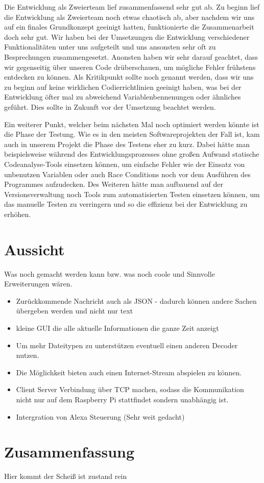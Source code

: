 Die Entwicklung als Zweierteam lief zusammenfassend sehr gut ab.
Zu beginn lief die Entwicklung als Zweierteam noch etwas chaotisch ab, aber
nachdem wir uns auf ein finales Grundkonzept geeinigt hatten, funktionierte die
Zusammenarbeit doch sehr gut. Wir haben bei der Umsetzungen die Entwicklung
verschiedener Funktionalitäten unter uns aufgeteilt und uns ansonsten sehr oft
zu Besprechungen zusammengesetzt. Anonsten haben wir sehr darauf geachtet, dass
wir gegenseitig über unseren Code drüberschauen, um mögliche Fehler frühstens
entdecken zu können. Als Kritikpunkt sollte noch genannt werden, dass wir uns
zu beginn auf keine wirklichen Codierrichtlinien geeinigt haben, was bei der
Entwicklung öfter mal zu abweichend Variablenbennenungen oder ähnliches
geführt. Dies sollte in Zukunft vor der Umsetzung beachtet werden. \newline

Ein weiterer Punkt, welcher beim nächsten Mal noch optimiert werden könnte ist
die Phase der Testung. Wie es in den meisten Softwareprojekten der Fall ist, %
kam auch in unserem Projekt die Phase des Testens eher zu kurz. Dabei hätte man
beispielsweise während des Entwicklungsprozesses ohne großen Aufwand statische
Codeanalyse-Tools einsetzen können, um einfache Fehler wie der Einsatz von
unbenutzen Variablen oder auch Race Conditions noch vor dem Ausführen des
Programmes aufzudecken. Des Weiteren hätte man aufbauend auf der
Versionsverwaltung noch Tools zum automatisierten Testen einsetzen können, um
das manuelle Testen zu verringern und so die effizienz bei der Entwicklung zu
erhöhen.

\begin{comment}
- Codierrichtlinien
- Viel gelernt
- Go als Programmiersprache
- Kommunikation über Sockets zwischen zwei Programmen
- Analyse zu kurz
- Testung zu kurz
  - Countinous Integration
  - Static Code analysis
  - automatic testing with unit test
\end{comment}



\section{Aussicht}

Was noch gemacht werden kann bzw. was noch coole und Sinnvolle Erweiterungen wären.
\begin{itemize}
\item Zurückkommende Nachricht auch als JSON - dadurch können andere Sachen übergeben werden und nicht nur text
\item kleine GUI die alle aktuelle Informationen die ganze Zeit anzeigt
\item Um mehr Dateitypen zu unterstützen eventuell einen anderen Decoder nutzen.
\item Die Möglichkeit bieten auch einen Internet-Stream abspielen zu können.
\item Client Server Verbindung über TCP machen, sodass die Kommunikation nicht nur auf dem Raspberry Pi stattfindet sondern unabhängig ist.
\item Intergration von Alexa Steuerung (Sehr weit gedacht)
\end{itemize}

\section{Zusammenfassung}
Hier kommt der Scheiß ist zustand rein

